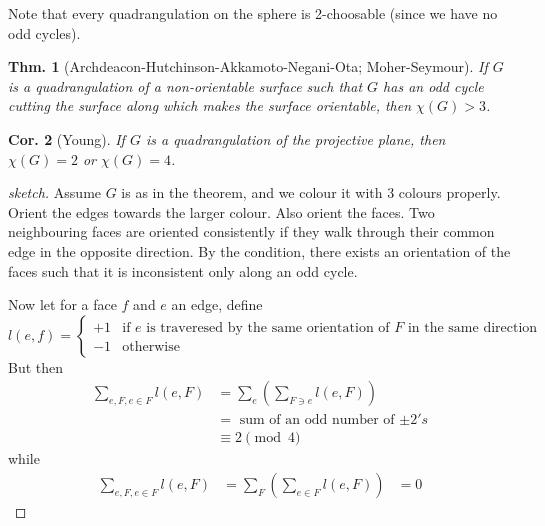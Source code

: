 \documentclass[12pt, a4paper]{book}
\newtheorem{theorem}{Thm.}[section]
\newtheorem{corollary}[theorem]{Cor.}
\theoremstyle{nonumberplain}
\newtheorem{proof}{Proof}
\begin{document}
Note that every quadrangulation on the sphere is 2-choosable (since we have no odd cycles).
\begin{theorem}[Archdeacon-Hutchinson-Akkamoto-Negani-Ota; Moher-Seymour]
    If $G$ is a quadrangulation of a non-orientable surface such that $G$ has an odd cycle cutting the surface along which makes the surface orientable, then $\chi(G)>3$.
\end{theorem}
\begin{corollary}[Young]
    If $G$ is a quadrangulation of the projective plane, then $\chi(G)=2$ or $\chi(G)=4$.
\end{corollary}
\begin{proof}[sketch]
    Assume $G$ is as in the theorem, and we colour it with 3 colours properly.
    Orient the edges towards the larger colour.
    Also orient the faces.
    Two neighbouring faces are oriented consistently if they walk through their common edge in the opposite direction.
    By the condition, there exists an orientation of the faces such that it is inconsistent only along an odd cycle.
    
    Now let for a face $f$ and $e$ an edge, define
    \begin{equation*}l(e,f)=
        \begin{cases}
            +1 &\text{if $e$ is traveresed by the same orientation of $F$ in the same direction}\\
            -1 &\text{otherwise}
        \end{cases}
    \end{equation*}
    But then
    \begin{align*}
        \sum\limits_{e,F,e\in F}l(e,F) &= \sum\limits_{e}\left(\sum\limits_{F\ni e} l(e,F)\right)\\
                                       &= \text{ sum of an odd number of $\pm 2's$}\\
                                       &\equiv 2\pmod{4}
    \end{align*}
    while
    \begin{align*}
        \sum\limits_{e,F,e\in F}l(e,F) &= \sum\limits_{F}\left(\sum\limits_{e\in F} l(e,F)\right)
                                       &= 0
    \end{align*}
\end{proof}
\begin{center}
    \begin{tikzpicture}
    \end{tikzpicture}
\end{center}
\end{document}

